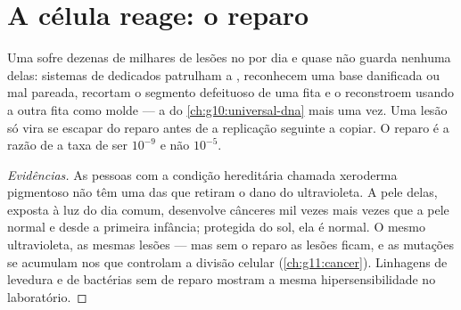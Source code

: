 \section{A célula reage: o reparo}

\begin{proposition}\label{prop:g11:mutations:repair}
Uma  sofre dezenas de milhares de lesões no  por dia e quase
não guarda nenhuma delas: sistemas de  dedicados patrulham a
, reconhecem uma base danificada ou mal pareada, recortam o
segmento defeituoso de uma fita e o reconstroem usando a outra fita
como molde --- a  do \cref{ch:g10:universal-dna} mais
uma vez. Uma lesão só vira  se escapar do reparo antes de a
replicação seguinte a copiar. O reparo é a razão de a taxa de 
ser $10^{-9}$ e não $10^{-5}$.
\end{proposition}
\begin{proof}[Evidências]
As pessoas com a condição hereditária chamada xeroderma pigmentoso não
têm uma das  que retiram o dano do ultravioleta. A pele delas,
exposta à luz do dia comum, desenvolve cânceres mil vezes mais vezes
que a pele normal e desde a primeira infância; protegida do sol, ela é
normal. O mesmo ultravioleta, as mesmas lesões --- mas sem o reparo as
lesões ficam, e as mutações se acumulam nos  que controlam a
divisão celular (\cref{ch:g11:cancer}). Linhagens de levedura e de
bactérias sem  de reparo mostram a mesma hipersensibilidade no
laboratório.
\end{proof}

